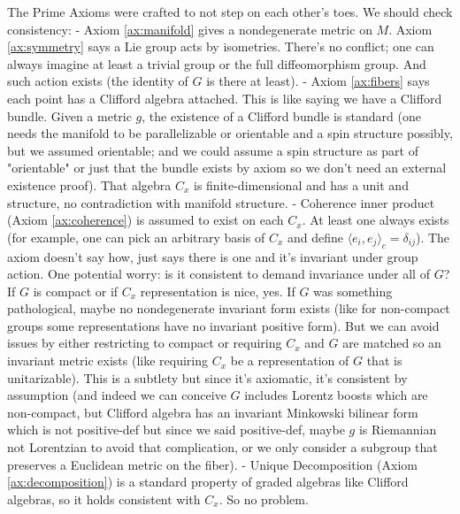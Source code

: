 \documentclass[11pt]{article}
\begin{document}
The Prime Axioms were crafted to not step on each other's toes. We should check consistency:
- Axiom \ref{ax:manifold} gives a nondegenerate metric on $M$. Axiom \ref{ax:symmetry} says a Lie group acts by isometries. There's no conflict; one can always imagine at least a trivial group or the full diffeomorphism group. And such action exists (the identity of $G$ is there at least).
- Axiom \ref{ax:fibers} says each point has a Clifford algebra attached. This is like saying we have a Clifford bundle. Given a metric $g$, the existence of a Clifford bundle is standard (one needs the manifold to be parallelizable or orientable and a spin structure possibly, but we assumed orientable; and we could assume a spin structure as part of "orientable" or just that the bundle exists by axiom so we don't need an external existence proof). That algebra $C_x$ is finite-dimensional and has a unit and structure, no contradiction with manifold structure.
- Coherence inner product (Axiom \ref{ax:coherence}) is assumed to exist on each $C_x$. At least one always exists (for example, one can pick an arbitrary basis of $C_x$ and define $\langle e_i,e_j\rangle_c = \delta_{ij}$). The axiom doesn't say how, just says there is one and it's invariant under group action. One potential worry: is it consistent to demand invariance under all of $G$? If $G$ is compact or if $C_x$ representation is nice, yes. If $G$ was something pathological, maybe no nondegenerate invariant form exists (like for non-compact groups some representations have no invariant positive form). But we can avoid issues by either restricting to compact or requiring $C_x$ and $G$ are matched so an invariant metric exists (like requiring $C_x$ be a representation of $G$ that is unitarizable). This is a subtlety but since it's axiomatic, it's consistent by assumption (and indeed we can conceive $G$ includes Lorentz boosts which are non-compact, but Clifford algebra has an invariant Minkowski bilinear form which is not positive-def but since we said positive-def, maybe $g$ is Riemannian not Lorentzian to avoid that complication, or we only consider a subgroup that preserves a Euclidean metric on the fiber).
- Unique Decomposition (Axiom \ref{ax:decomposition}) is a standard property of graded algebras like Clifford algebras, so it holds consistent with $C_x$. So no problem.
\end{document}
